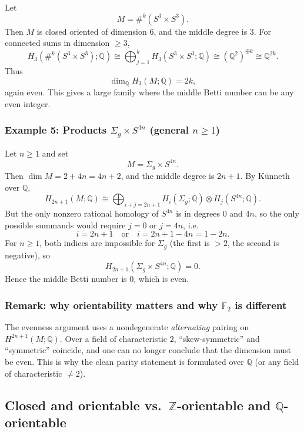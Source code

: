\documentclass[12pt,a4paper]{article}
\theoremstyle{notespace}
\begin{document}
Let
\[
M=\#^k(S^3\times S^3).
\]
Then \(M\) is closed oriented of dimension \(6\), and the middle degree is \(3\).
For connected sums in dimension \(\ge 3\),
\[
H_3\!\left(\#^k(S^3\times S^3);\mathbb Q\right)
\cong
\bigoplus_{j=1}^k H_3(S^3\times S^3;\mathbb Q)
\cong
(\mathbb Q^2)^{\oplus k}\cong \mathbb Q^{2k}.
\]
Thus
\[
\dim_{\mathbb Q} H_3(M;\mathbb Q)=2k,
\]
again even. This gives a large family where the middle Betti number can be any even integer.

\subsubsection{Example 5: Products \(\Sigma_g\times S^{4n}\) (general \(n\ge 1\))}

Let \(n\ge 1\) and set
\[
M=\Sigma_g\times S^{4n}.
\]
Then \(\dim M=2+4n=4n+2\), and the middle degree is \(2n+1\).
By K\"unneth over \(\mathbb Q\),
\[
H_{2n+1}(M;\mathbb Q)
\cong
\bigoplus_{i+j=2n+1} H_i(\Sigma_g;\mathbb Q)\otimes H_j(S^{4n};\mathbb Q).
\]
But the only nonzero rational homology of \(S^{4n}\) is in degrees \(0\) and \(4n\), so the only possible
summands would require \(j=0\) or \(j=4n\), i.e.
\[
i=2n+1 \quad \text{or}\quad i=2n+1-4n=1-2n.
\]
For \(n\ge 1\), both indices are impossible for \(\Sigma_g\) (the first is \(>2\), the second is negative), so
\[
H_{2n+1}(\Sigma_g\times S^{4n};\mathbb Q)=0.
\]
Hence the middle Betti number is \(0\), which is even.

\subsubsection{Remark: why orientability matters and why \(\mathbb F_2\) is different}

The evenness argument uses a nondegenerate \emph{alternating} pairing on \(H^{2n+1}(M;\mathbb Q)\).
Over a field of characteristic \(2\), “skew-symmetric” and “symmetric” coincide, and one can no longer
conclude that the dimension must be even. This is why the clean parity statement is formulated over
\(\mathbb Q\) (or any field of characteristic \(\neq 2\)).


\subsection{Closed and orientable vs.\ \(\mathbb Z\)-orientable and \(\mathbb Q\)-orientable}
\end{document}
